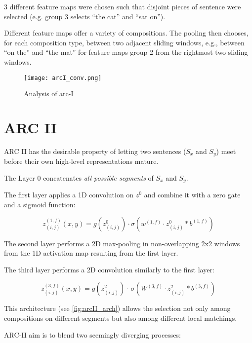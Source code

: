 3 different feature maps were chosen such that disjoint pieces of sentence were
selected (e.g. group 3 selects ``the cat'' and ``sat on'').

Different feature maps offer a variety of compositions. The pooling then
chooses, for each composition type, between two adjacent sliding windows, e.g.,
between ``on the'' and ``the mat'' for feature maps group 2 from the rightmost
two sliding windows.

\begin{figure}[H]
  \centering
  \texttt{[image: arcI\_conv.png]}
  \caption{Analysis of arc-I}
  \label{fig:arcI_conv}
\end{figure}

\section{ARC II}

ARC II has the desirable property of letting two sentences ($S_x$ and $S_y$)
meet before their own high-level representations mature.

The Layer 0 concatenates \textit{all possible segments} of $S_x$ and $S_y$. 


The first layer applies a 1D convolution on $z^0$ and combine it with a zero gate and a sigmoid function:

\begin{equation}
\tag{First layer of ARCII, 1D convolution on two sentences segments}
z_{(i,j)}^{(1,f)} (x,y) = g(z_{(i,j)}^0) \cdot \sigma (w^{(1, f)} \cdot z_{(i,j)}^0 * b^{(1,f)})
\end{equation}

The second layer performs a 2D max-pooling in non-overlapping 2x2 windows from the 1D activation map resulting from the first layer.

The third layer performs a 2D convolution similarly to the first layer:

\begin{equation}
\tag{Thirs layer of ARCII, 2D convolution}
z_{(i,j)}^{(3,f)} (x,y) = g(z_{(i,j)}^2) \cdot \ \sigma (W^{(3, f)} \cdot z_{(i,j)}^2 * b^{(3,f)})
\end{equation}

This architecture (see \ref{fig:arcII_arch}) allows the selection not only among compositions on different segments but also among different local matchings.

ARC-II aim is to blend two seemingly diverging processes:

